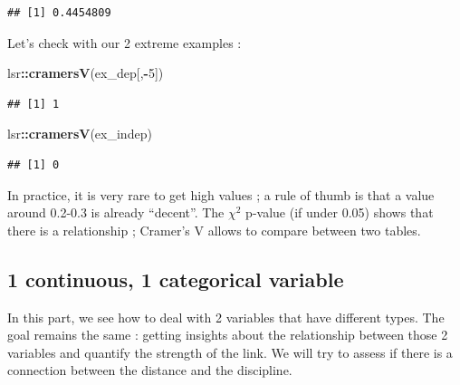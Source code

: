 \documentclass[
]{book}
\newenvironment{Shaded}{\begin{snugshade}}{\end{snugshade}}
\newcommand{\CommentTok}[1]{\textcolor[rgb]{0.56,0.35,0.01}{\textit{#1}}}
\newcommand{\DecValTok}[1]{\textcolor[rgb]{0.00,0.00,0.81}{#1}}
\newcommand{\KeywordTok}[1]{\textcolor[rgb]{0.13,0.29,0.53}{\textbf{#1}}}
\newcommand{\NormalTok}[1]{#1}
\newcommand{\OperatorTok}[1]{\textcolor[rgb]{0.81,0.36,0.00}{\textbf{#1}}}
\newcommand{\StringTok}[1]{\textcolor[rgb]{0.31,0.60,0.02}{#1}}
\begin{document}
\begin{Shaded}
\end{Shaded}

\begin{verbatim}
## [1] 0.4454809
\end{verbatim}

Let's check with our 2 extreme examples :

\begin{Shaded}
\begin{Highlighting}[]
\NormalTok{lsr}\OperatorTok{::}\KeywordTok{cramersV}\NormalTok{(ex_dep[,}\OperatorTok{-}\DecValTok{5}\NormalTok{])}
\end{Highlighting}
\end{Shaded}

\begin{verbatim}
## [1] 1
\end{verbatim}

\begin{Shaded}
\begin{Highlighting}[]
\NormalTok{lsr}\OperatorTok{::}\KeywordTok{cramersV}\NormalTok{(ex_indep)}
\end{Highlighting}
\end{Shaded}

\begin{verbatim}
## [1] 0
\end{verbatim}

In practice, it is very rare to get high values ; a rule of thumb is that a value around 0.2-0.3 is already ``decent''. The \(\chi^2\) p-value (if under 0.05) shows that there is a relationship ; Cramer's V allows to compare between two tables.

\hypertarget{continuous-1-categorical-variable}{%
\subsection{1 continuous, 1 categorical variable}\label{continuous-1-categorical-variable}}

In this part, we see how to deal with 2 variables that have different types. The goal remains the same : getting insights about the relationship between those 2 variables and quantify the strength of the link.
We will try to assess if there is a connection between the distance and the discipline.
\end{document}
